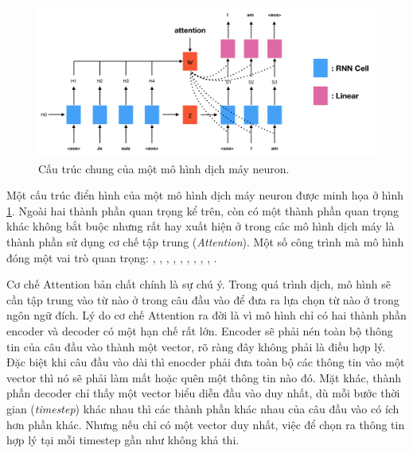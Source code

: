 \documentclass[14pt, a4paper]{article}
\numberwithin{equation}{section}
\numberwithin{algorithm}{section}
\numberwithin{figure}{section}
\numberwithin{table}{section}
\numberwithin{dl}{section}
\numberwithin{md}{section}
\numberwithin{bd}{section}
\numberwithin{dn}{section}
\numberwithin{hq}{section}
\begin{document}
    \begin{figure}[h!] \centering

        \includegraphics[scale=0.35]{Neural_Machine_Translation_Architecture.png}
        \caption{Cấu trúc chung của một mô hình dịch máy neuron.}
    
        \label{fig:Neural_Machine_Translation_Architecture}
    \end{figure}

    Một cấu trúc điển hình của một mô hình dịch máy neuron được minh họa ở hình \ref{fig:Neural_Machine_Translation_Architecture}.
    Ngoài hai thành phần quan trọng kể trên, còn có một thành phần quan trọng khác không bắt buộc nhưng rất hay xuất hiện ở trong các mô hình dịch máy là thành phần sử dụng cơ chế tập trung (\textit{Attention}).
    Một số công trình mà mô hình đóng một vai trò quan trọng: \cite{bahdanau2014neural}, \cite{luong2014addressing}, \cite{jean2014using}, \cite{luong2015effective}, \cite{tang2016neural}, \cite{wang2016memory}, \cite{li2016towards}, \cite{tu2016modeling}, \cite{shen2015minimum}, \cite{zhou2016deep}.

    Cơ chế Attention bản chất chính là sự chú ý. Trong quá trình dịch, mô hình sẽ cần tập trung vào từ nào ở trong câu đầu vào để đưa ra lựa chọn từ nào ở trong ngôn ngữ đích.
    Lý do cơ chế Attention ra đời là vì mô hình chỉ có hai thành phần encoder và decoder có một hạn chế rất lớn. Encoder sẽ phải nén toàn bộ thông tin của câu đầu vào thành một vector, rõ ràng đây không phải là điều hợp lý.
    Đặc biệt khi câu đầu vào dài thì enocder phải đưa toàn bộ các thông tin vào một vector thì nó sẽ phải làm mất hoặc quên một thông tin nào đó.
    Mặt khác, thành phần decoder chỉ thấy một vector biểu diễn đầu vào duy nhất, dù mỗi bước thời gian (\textit{timestep}) khác nhau thì các thành phần khác nhau của câu đầu vào có ích hơn phần khác.
    Nhưng nếu chỉ có một vector duy nhất, việc để chọn ra thông tin hợp lý tại mỗi timestep gần như không khả thi.
\end{document}
